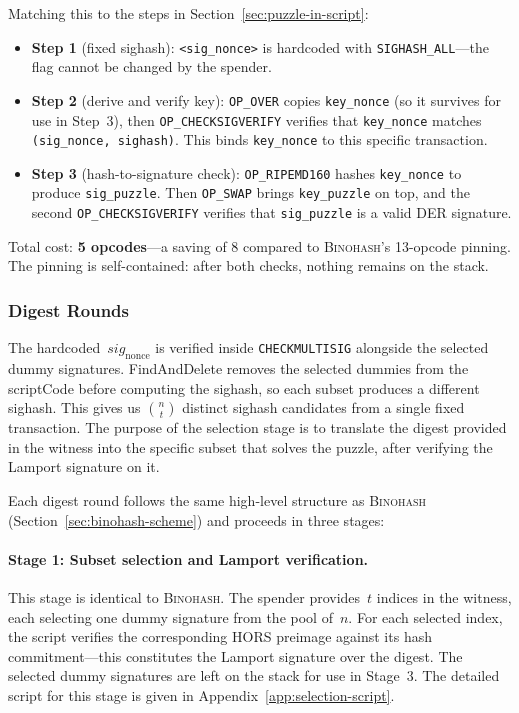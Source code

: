 \documentclass[11pt, a4paper]{article}
\begin{document}
\noindent Matching this to the steps in Section~\ref{sec:puzzle-in-script}:

\begin{itemize}
    \item \textbf{Step 1} (fixed sighash): \texttt{<sig\_nonce>} is hardcoded with \texttt{SIGHASH\_ALL}---the flag cannot be changed by the spender.

    \item \textbf{Step 2} (derive and verify key): \texttt{OP\_OVER} copies \texttt{key\_nonce} (so it survives for use in Step~3), then \texttt{OP\_CHECKSIGVERIFY} verifies that \texttt{key\_nonce} matches \texttt{(sig\_nonce, sighash)}. This binds \texttt{key\_nonce} to this specific transaction.

    \item \textbf{Step 3} (hash-to-signature check): \texttt{OP\_RIPEMD160} hashes \texttt{key\_nonce} to produce \texttt{sig\_puzzle}. Then \texttt{OP\_SWAP} brings \texttt{key\_puzzle} on top, and the second \texttt{OP\_CHECKSIGVERIFY} verifies that \texttt{sig\_puzzle} is a valid DER signature.
\end{itemize}

\noindent Total cost: \textbf{5 opcodes}---a saving of 8 compared to \textsc{Binohash}'s 13-opcode pinning. The pinning is self-contained: after both checks, nothing remains on the stack.

\subsubsection{Digest Rounds}
\label{sec:qs-rounds}

The hardcoded~$\mathit{sig}_{\mathrm{nonce}}$ is verified inside \texttt{CHECKMULTISIG} alongside the selected dummy signatures. FindAndDelete removes the selected dummies from the scriptCode before computing the sighash, so each subset produces a different sighash. This gives us $\binom{n}{t}$ distinct sighash candidates from a single fixed transaction. The purpose of the selection stage is to translate the digest provided in the witness into the specific subset that solves the puzzle, after verifying the Lamport signature on it.

Each digest round follows the same high-level structure as \textsc{Binohash} (Section~\ref{sec:binohash-scheme}) and proceeds in three stages:

\paragraph{Stage 1: Subset selection and Lamport verification.}
This stage is identical to \textsc{Binohash}. The spender provides~$t$ indices in the witness, each selecting one dummy signature from the pool of~$n$. For each selected index, the script verifies the corresponding HORS preimage against its hash commitment---this constitutes the Lamport signature over the digest. The selected dummy signatures are left on the stack for use in Stage~3. The detailed script for this stage is given in Appendix~\ref{app:selection-script}.
\end{document}

